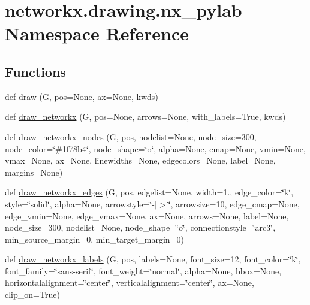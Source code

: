 \hypertarget{namespacenetworkx_1_1drawing_1_1nx__pylab}{}\section{networkx.\+drawing.\+nx\+\_\+pylab Namespace Reference}
\label{namespacenetworkx_1_1drawing_1_1nx__pylab}
\subsection*{Functions}
\begin{DoxyCompactItemize}
\item 
def \hyperlink{namespacenetworkx_1_1drawing_1_1nx__pylab_ad6f777a242efbef8330552f619f2b635}{draw} (G, pos=None, ax=None, kwds)
\item 
def \hyperlink{namespacenetworkx_1_1drawing_1_1nx__pylab_ac656ed97042c7dca44219020d17dee0a}{draw\+\_\+networkx} (G, pos=None, arrows=None, with\+\_\+labels=True, kwds)
\item 
def \hyperlink{namespacenetworkx_1_1drawing_1_1nx__pylab_a3f26ea20c4799842a65c35f71f31adeb}{draw\+\_\+networkx\+\_\+nodes} (G, pos, nodelist=None, node\+\_\+size=300, node\+\_\+color=\char`\"{}\#1f78b4\char`\"{}, node\+\_\+shape=\char`\"{}o\char`\"{}, alpha=\+None, cmap=\+None, vmin=\+None, vmax=\+None, ax=\+None, linewidths=\+None, edgecolors=\+None, label=\+None, margins=\+None)
\item 
def \hyperlink{namespacenetworkx_1_1drawing_1_1nx__pylab_a4cb9e85a2799e28ec7e0dc97a400ba9b}{draw\+\_\+networkx\+\_\+edges} (G, pos, edgelist=None, width=1., edge\+\_\+color=\char`\"{}k\char`\"{}, style=\char`\"{}solid\char`\"{}, alpha=None, arrowstyle=\char`\"{}-\/$\vert$$>$\char`\"{}, arrowsize=10, edge\+\_\+cmap=None, edge\+\_\+vmin=None, edge\+\_\+vmax=None, ax=None, arrows=None, label=None, node\+\_\+size=300, nodelist=None, node\+\_\+shape=\char`\"{}o\char`\"{}, connectionstyle=\char`\"{}arc3\char`\"{}, min\+\_\+source\+\_\+margin=0, min\+\_\+target\+\_\+margin=0)
\item 
def \hyperlink{namespacenetworkx_1_1drawing_1_1nx__pylab_a36145e7e2e1717b10a72c53e4d2dc582}{draw\+\_\+networkx\+\_\+labels} (G, pos, labels=None, font\+\_\+size=12, font\+\_\+color=\char`\"{}k\char`\"{}, font\+\_\+family=\char`\"{}sans-\/serif\char`\"{}, font\+\_\+weight=\char`\"{}normal\char`\"{}, alpha=None, bbox=None, horizontalalignment=\char`\"{}center\char`\"{}, verticalalignment=\char`\"{}center\char`\"{}, ax=None, clip\+\_\+on=True)
$$
\end{DoxyCompactItemize}
